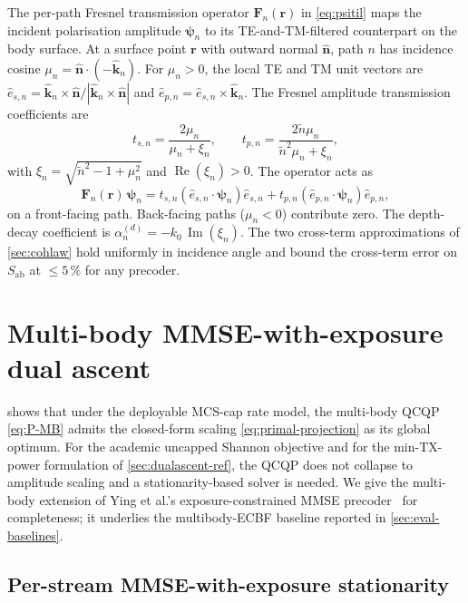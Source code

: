 \documentclass[journal,twocolumn,10pt]{IEEEtran}
\theoremstyle{plain}
\theoremstyle{remark}
\newcommand{\khat}{\hat{\bm{k}}}
\newcommand{\nhat}{\hat{\bm{n}}}
\newcommand{\rr}{\mathbf{r}}
\newcommand{\Sab}{S_{\mathrm{ab}}}
\newcommand{\Fn}{\mathbf{F}_n}
\newcommand{\psin}{\bm{\psi}_n}
\newcommand{\ntilde}{\tilde{n}}
\DeclareMathOperator{\RE}{Re}
\DeclareMathOperator{\IM}{Im}
\begin{document}
The per-path Fresnel transmission operator $\Fn(\rr)$ in
\cref{eq:psitil} maps the incident polarisation amplitude $\psin$
to its TE-and-TM-filtered counterpart on the body surface. At a
surface point $\rr$ with outward normal $\nhat$, path $n$ has
incidence cosine $\mu_n = \nhat \cdot (-\khat_n)$. For $\mu_n > 0$,
the local TE and TM unit vectors are
$\hat{e}_{s,n} = \khat_n \times \nhat / |\khat_n \times \nhat|$ and
$\hat{e}_{p,n} = \hat{e}_{s,n} \times \khat_n$. The Fresnel
amplitude transmission coefficients are
\begin{equation}\label{eq:t-coef-app}
  t_{s,n} = \frac{2 \mu_n}{\mu_n + \xi_n},
  \qquad
  t_{p,n} = \frac{2 \ntilde \mu_n}{\ntilde^2 \mu_n + \xi_n},
\end{equation}
with $\xi_n = \sqrt{\ntilde^2 - 1 + \mu_n^2}$ and
$\RE(\xi_n) > 0$. The operator acts as
\begin{equation}\label{eq:F-action}
  \Fn(\rr)\,\psin = t_{s,n}(\hat{e}_{s,n} \cdot \psin)
  \hat{e}_{s,n} + t_{p,n}(\hat{e}_{p,n} \cdot \psin) \hat{e}_{p,n},
\end{equation}
on a front-facing path. Back-facing paths ($\mu_n < 0$) contribute
zero. The depth-decay coefficient is
$\alpha_n^{(d)} = -k_0\,\IM(\xi_n)$. The two cross-term
approximations of \cref{sec:cohlaw} hold uniformly in incidence
angle and bound the cross-term error on $\Sab$ at $\leq 5\,\%$ for
any precoder.


\section{Multi-body MMSE-with-exposure dual ascent}\label{app:dualascent}

 shows that under the deployable
MCS-cap rate model, the multi-body QCQP \cref{eq:P-MB} admits the
closed-form scaling \cref{eq:primal-projection} as its global
optimum. For the academic uncapped Shannon objective and for the
min-TX-power formulation of \cref{sec:dualascent-ref}, the QCQP
does not collapse to amplitude scaling and a stationarity-based
solver is needed. We give the multi-body extension of Ying et
al.'s exposure-constrained MMSE precoder~\cite{Ying2015,Ying2017}
for completeness; it underlies the multibody-ECBF baseline reported
in \cref{sec:eval-baselines}.

\subsection*{Per-stream MMSE-with-exposure stationarity}
\end{document}
